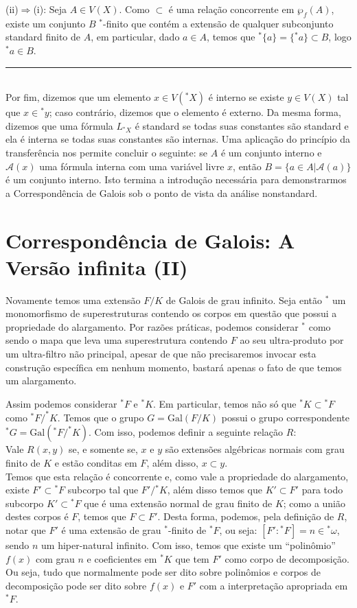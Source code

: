 \documentclass[12pt,a4paper]{article}
\def\eop{\hfill\rule{2.5mm}{2.5mm} \\ }
\theoremstyle{definition}
\begin{document}
(ii)$\Rightarrow$(i): Seja $A\in V(X)$. Como $\subset$ é uma relação concorrente em $\wp_f(A)$, existe um conjunto $B$ $^*$-finito que contém a extensão de qualquer subconjunto standard finito de $A$, em particular, dado $a\in A$, temos que $^*\{a\}=\{{^*a}\}\subset B$, logo $^*a\in B$. \eop

Por fim, dizemos que um elemento $x\in V({^*X})$ é interno se existe $y\in V(X)$ tal que $x\in {^*y}$; caso contrário, dizemos que o elemento é externo. Da mesma forma, dizemos que uma fórmula $L_{{^*X}}$ é standard se todas suas constantes são standard e ela é interna se todas suas constantes são internas. Uma aplicação do princípio da transferência nos permite concluir o seguinte: se $A$ é um conjunto interno e $\mathscr{A}(x)$ uma fórmula interna com uma variável livre $x$, então $B=\{a\in A | \mathscr{A}(a)\}$ é um conjunto interno. Isto termina a introdução necessária para demonstrarmos a Correspondência de Galois sob o ponto de vista da análise nonstandard. 

\section{Correspondência de Galois: A Versão infinita (II)}

Novamente temos uma extensão $F/K$ de Galois de grau infinito. Seja então $^*$ um monomorfismo de superestruturas contendo os corpos em questão que possui a propriedade do alargamento. Por razões práticas, podemos considerar $^*$ como sendo o mapa que leva uma superestrutura contendo $F$ ao seu ultra-produto por um ultra-filtro não principal, apesar de que não precisaremos invocar esta construção específica em nenhum momento, bastará apenas o fato de que temos um alargamento. 

Assim podemos considerar $^*F$ e $^*K$. Em particular, temos não só que $^*K\subset {^*F}$ como $^*F/^*K$. Temos que o grupo $G=\text{Gal}(F/K)$ possui o grupo correspondente $^*G= \text{Gal}(^*F/^*K)$. Com isso, podemos definir a seguinte relação $R$: \\

Vale $R(x,y)$ se, e somente se, $x$ e $y$ são extensões algébricas normais com grau finito de $K$ e estão conditas em $F$, além disso, $x\subset y$. \\

Temos que esta relação é concorrente e, como vale a propriedade do alargamento, existe $F'\subset {^*F}$ subcorpo tal que $F'/{^*K}$, além disso temos que $K'\subset F'$ para todo subcorpo $K'\subset {^*F}$ que é uma extensão normal de grau finito de $K$; como a união destes corpos é $F$, temos que $F\subset F'$. Desta forma, podemos, pela definição de $R$, notar que $F'$ é uma extensão de grau $^*$-finito de ${^*F}$, ou seja: $[F':{^*F}]=n\in {^*\omega}$, sendo $n$ um hiper-natural infinito. Com isso, temos que existe um ``polinômio'' $f(x)$ com grau $n$ e coeficientes em ${^*K}$ que tem $F'$ como corpo de decomposição. Ou seja, tudo que normalmente pode ser dito sobre polinômios e corpos de decomposição pode ser dito sobre $f(x)$ e $F'$ com a interpretação apropriada em ${^*F}$. 
\end{document}
